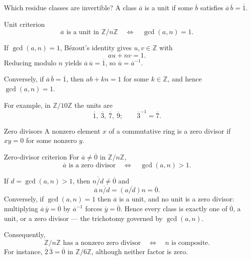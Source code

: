 \documentclass[aspectratio=169,11pt]{beamer}
\newcommand{\Z}{\mathbb Z}
\begin{document}
\begin{frame}{Which residue classes are invertible?}
  \small
  A class \(\overline a\) is a \alert{unit} if some \(\overline b\)
  satisfies \(\overline a\,\overline b=\overline1\).

  \begin{block}{Unit criterion}
    \[
      \boxed{\overline a\text{ is a unit in }\Z/n\Z
        \quad\Longleftrightarrow\quad \gcd(a,n)=1.}
    \]
  \end{block}

  If \(\gcd(a,n)=1\), B\'ezout's identity gives \(u,v\in\Z\) with
  \[
    au+nv=1.
  \]
  Reducing modulo \(n\) yields
  \(\overline a\,\overline u=\overline1\), so
  \(\overline u=\overline a^{-1}\).

  Conversely, if \(\overline a\,\overline b=\overline1\), then
  \(ab+kn=1\) for some \(k\in\Z\), and hence \(\gcd(a,n)=1\).

  For example, in \(\Z/10\Z\) the units are
  \[
    \overline1,\ \overline3,\ \overline7,\ \overline9;
    \qquad
    \overline3^{-1}=\overline7.
  \]
\end{frame}

\begin{frame}{Zero divisors}
  \small
  A nonzero element \(x\) of a commutative ring is a \alert{zero divisor}
  if \(xy=0\) for some nonzero \(y\).

  \begin{block}{Zero-divisor criterion}
    For \(\overline a\ne\overline0\) in \(\Z/n\Z\),
    \[
      \boxed{\overline a\text{ is a zero divisor}
        \quad\Longleftrightarrow\quad \gcd(a,n)>1.}
    \]
  \end{block}

  If \(d=\gcd(a,n)>1\), then \(\overline{n/d}\ne\overline0\) and
  \[
    \overline a\,\overline{n/d}
      =\overline{(a/d)n}=\overline0.
  \]
  Conversely, if \(\gcd(a,n)=1\) then \(\overline a\) is a unit, and no unit
  is a zero divisor: multiplying \(\overline a\,\overline y=\overline0\) by
  \(\overline a^{-1}\) forces \(\overline y=\overline0\).  Hence every class
  is exactly one of \(\overline0\), a unit, or a zero divisor --- the
  trichotomy governed by \(\gcd(a,n)\).

  Consequently,
  \[
    \boxed{\Z/n\Z\text{ has a nonzero zero divisor}
      \quad\Longleftrightarrow\quad n\text{ is composite}.}
  \]
  For instance, \(\overline2\,\overline3=\overline0\) in
  \(\Z/6\Z\), although neither factor is zero.
\end{frame}
\end{document}

